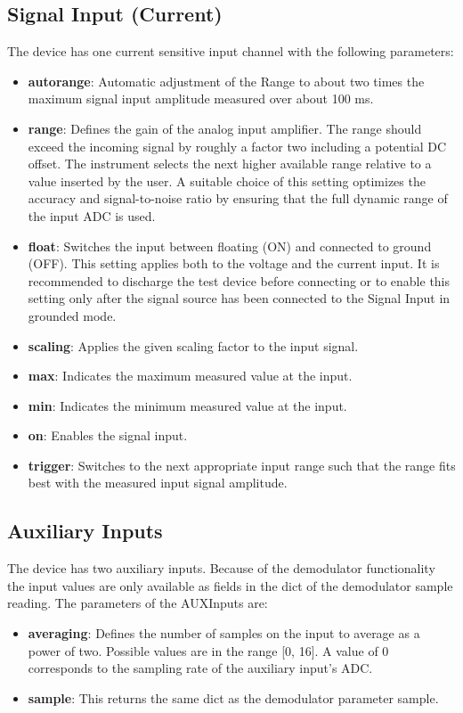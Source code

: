 \documentclass[11pt]{article} %
\begin{document}
\subsection{Signal Input (Current)}
The device has one current sensitive input channel with the following parameters:
\begin{itemize}
\item {\bf autorange}: Automatic adjustment of the Range to about two times the maximum signal input amplitude measured over about 100 ms.
\item {\bf range}: Defines the gain of the analog input amplifier. The range should exceed the incoming signal by roughly a factor two including a potential DC offset. The instrument selects the next higher available range relative to a value inserted by the user. A suitable choice of this setting optimizes the accuracy and signal-to-noise ratio by ensuring that the full dynamic range of the input ADC is used.
\item {\bf float}: Switches the input between floating (ON) and connected to ground (OFF). This setting applies both to the voltage and the current input. It is recommended to discharge the test device before connecting or to enable this setting only after the signal source has been connected to the Signal Input in grounded mode.
\item {\bf scaling}: Applies the given scaling factor to the input signal.
\item {\bf max}: Indicates the maximum measured value at the input.
\item {\bf min}: Indicates the minimum measured value at the input.
\item {\bf on}: Enables the signal input.
\item {\bf trigger}: Switches to the next appropriate input range such that the range fits best with the measured input signal amplitude.
\end{itemize}


\subsection{Auxiliary Inputs}
The device has two auxiliary inputs. Because of the demodulator functionality the input values are only available as fields in the dict of the demodulator sample reading. The parameters of the AUXInputs are:
\begin{itemize}
\item {\bf averaging}: Defines the number of samples on the input to average as a power of two. Possible values are in the range [0, 16]. A value of 0 corresponds to the sampling rate of the auxiliary input's ADC.
\item {\bf sample}: This returns the same dict as the demodulator parameter sample.
\end{itemize}
\end{document}
